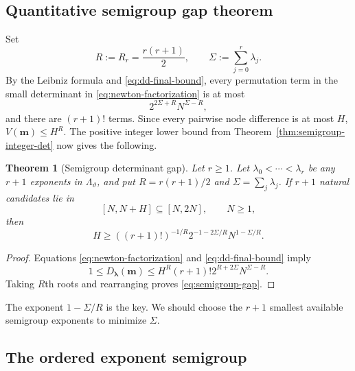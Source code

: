 \documentclass[11pt,oneside]{article}
\newtheorem{theorem}{Theorem}[section]
\theoremstyle{definition}
\theoremstyle{remark}
\newcommand{\thetaq}{\vartheta}
\newcommand{\LambdaTheta}{\Lambda_{\thetaq}}
\begin{document}
\subsection{Quantitative semigroup gap theorem}

Set
\[
 R:=R_r=\frac{r(r+1)}2,
 \qquad
 \Sigma:=\sum_{j=0}^{r}\lambda_j.
\]
By the Leibniz formula and \eqref{eq:dd-final-bound}, every permutation term in the small
determinant in \eqref{eq:newton-factorization} is at most
\[
 2^{2\Sigma+R}N^{\Sigma-R},
\]
and there are $(r+1)!$ terms.  Since every pairwise node difference is at most $H$,
$V(\boldsymbol m)\le H^R$.  The positive integer lower bound from
Theorem~\ref{thm:semigroup-integer-det} now gives the following.

\begin{theorem}[Semigroup determinant gap]
\label{thm:semigroup-gap}
Let $r\ge1$.  Let $\lambda_0<\cdots<\lambda_r$ be any $r+1$ exponents in
$\LambdaTheta$, and put $R=r(r+1)/2$ and $\Sigma=\sum_j\lambda_j$.  If $r+1$ natural
candidates lie in
\[
 [N,N+H]\subseteq[N,2N],
 \qquad N\ge1,
\]
then
\begin{equation}
 H\ge
 ((r+1)!)^{-1/R}
 2^{-1-2\Sigma/R}
 N^{1-\Sigma/R}.
 \label{eq:semigroup-gap}
\end{equation}
\end{theorem}

\begin{proof}
Equations \eqref{eq:newton-factorization} and \eqref{eq:dd-final-bound} imply
\[
 1\le D_{\boldsymbol\lambda}(\boldsymbol m)
 \le
 H^R(r+1)!2^{R+2\Sigma}N^{\Sigma-R}.
\]
Taking $R$th roots and rearranging proves \eqref{eq:semigroup-gap}.
\end{proof}

The exponent $1-\Sigma/R$ is the key.  We should choose the $r+1$ smallest available
semigroup exponents to minimize $\Sigma$.

\subsection{The ordered exponent semigroup}
\end{document}
